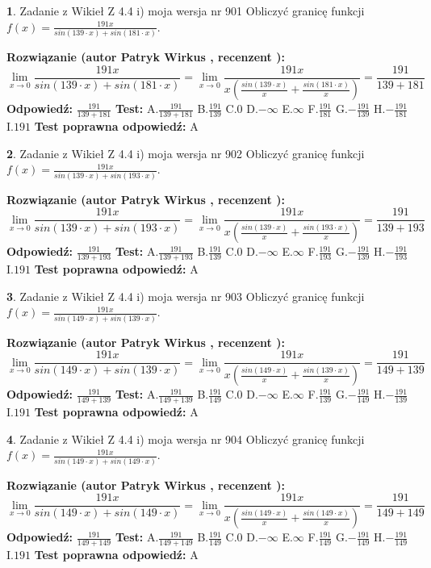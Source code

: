 \documentclass[12pt, a4paper]{article}
\theoremstyle{definition} %
\newtheorem{zad}{}
\newcommand{\zadStart}[1]{\begin{zad}#1\newline}
\newcommand{\zadStop}{\end{zad}}
\newcommand{\rozwStart}[2]{\noindent \textbf{Rozwiązanie (autor #1 , recenzent #2): }\newline}
\newcommand{\rozwStop}{\newline}
\newcommand{\odpStart}{\noindent \textbf{Odpowiedź:}\newline}
\newcommand{\odpStop}{\newline}
\newcommand{\testStart}{\noindent \textbf{Test:}\newline}
\newcommand{\testStop}{\newline}
\newcommand{\kluczStart}{\noindent \textbf{Test poprawna odpowiedź:}\newline}
\newcommand{\kluczStop}{\newline}
\begin{document}
\zadStart{Zadanie z Wikieł Z 4.4 i) moja wersja nr 901}
Obliczyć granicę funkcji $f(x)=\frac{191x}{sin(139\cdot x) +sin(181\cdot x)}$.
\zadStop
\rozwStart{Patryk Wirkus}{}
$$\lim\limits_{x\to 0}\frac{191x}{sin(139\cdot x) +sin(181\cdot x)}=\lim\limits_{x\to 0}\frac{191x}{x(\frac{sin(139\cdot x)}{x}+\frac{sin(181\cdot x)}{x})}=\frac{191}{139+181}$$
\rozwStop
\odpStart
$\frac{191}{139+181}$
\odpStop
\testStart
A.$\frac{191}{139+181}$
B.$\frac{191}{139}$
C.$0$
D.$-\infty$
E.$\infty$
F.$\frac{191}{181}$
G.$-\frac{191}{139}$
H.$-\frac{191}{181}$
I.$191$
\testStop
\kluczStart
A
\kluczStop



\zadStart{Zadanie z Wikieł Z 4.4 i) moja wersja nr 902}
Obliczyć granicę funkcji $f(x)=\frac{191x}{sin(139\cdot x) +sin(193\cdot x)}$.
\zadStop
\rozwStart{Patryk Wirkus}{}
$$\lim\limits_{x\to 0}\frac{191x}{sin(139\cdot x) +sin(193\cdot x)}=\lim\limits_{x\to 0}\frac{191x}{x(\frac{sin(139\cdot x)}{x}+\frac{sin(193\cdot x)}{x})}=\frac{191}{139+193}$$
\rozwStop
\odpStart
$\frac{191}{139+193}$
\odpStop
\testStart
A.$\frac{191}{139+193}$
B.$\frac{191}{139}$
C.$0$
D.$-\infty$
E.$\infty$
F.$\frac{191}{193}$
G.$-\frac{191}{139}$
H.$-\frac{191}{193}$
I.$191$
\testStop
\kluczStart
A
\kluczStop



\zadStart{Zadanie z Wikieł Z 4.4 i) moja wersja nr 903}
Obliczyć granicę funkcji $f(x)=\frac{191x}{sin(149\cdot x) +sin(139\cdot x)}$.
\zadStop
\rozwStart{Patryk Wirkus}{}
$$\lim\limits_{x\to 0}\frac{191x}{sin(149\cdot x) +sin(139\cdot x)}=\lim\limits_{x\to 0}\frac{191x}{x(\frac{sin(149\cdot x)}{x}+\frac{sin(139\cdot x)}{x})}=\frac{191}{149+139}$$
\rozwStop
\odpStart
$\frac{191}{149+139}$
\odpStop
\testStart
A.$\frac{191}{149+139}$
B.$\frac{191}{149}$
C.$0$
D.$-\infty$
E.$\infty$
F.$\frac{191}{139}$
G.$-\frac{191}{149}$
H.$-\frac{191}{139}$
I.$191$
\testStop
\kluczStart
A
\kluczStop



\zadStart{Zadanie z Wikieł Z 4.4 i) moja wersja nr 904}
Obliczyć granicę funkcji $f(x)=\frac{191x}{sin(149\cdot x) +sin(149\cdot x)}$.
\zadStop
\rozwStart{Patryk Wirkus}{}
$$\lim\limits_{x\to 0}\frac{191x}{sin(149\cdot x) +sin(149\cdot x)}=\lim\limits_{x\to 0}\frac{191x}{x(\frac{sin(149\cdot x)}{x}+\frac{sin(149\cdot x)}{x})}=\frac{191}{149+149}$$
\rozwStop
\odpStart
$\frac{191}{149+149}$
\odpStop
\testStart
A.$\frac{191}{149+149}$
B.$\frac{191}{149}$
C.$0$
D.$-\infty$
E.$\infty$
F.$\frac{191}{149}$
G.$-\frac{191}{149}$
H.$-\frac{191}{149}$
I.$191$
\testStop
\kluczStart
A
\kluczStop
\end{document}
